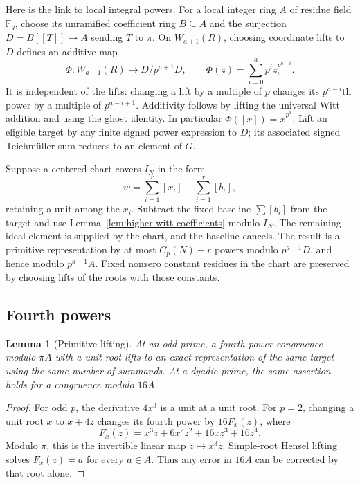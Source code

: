 \documentclass[11pt]{amsart}
\newtheorem{lemma}[theorem]{Lemma}
\theoremstyle{definition}
\numberwithin{equation}{section}
\begin{document}
Here is the link to local integral powers. For a local integer ring
$A$ of residue field $\mathbb F_q$, choose its unramified coefficient
ring $B\subseteq A$ and the surjection $D=B[[T]]\to A$ sending
$T$ to $\pi$. On $W_{a+1}(R)$, choosing coordinate lifts to $D$
defines an additive map
\begin{equation}\label{eq:higher-last-ghost}
 \Phi:W_{a+1}(R)\longrightarrow D/p^{a+1}D,
 \qquad \Phi(z)=\sum_{i=0}^a p^i\widetilde z_i^{p^{a-i}}.
\end{equation}
It is independent of the lifts: changing a lift by a multiple of
$p$ changes its $p^{a-i}$th power by a multiple of $p^{a-i+1}$.
Additivity follows by lifting the universal Witt addition and using
the ghost identity. In particular $\Phi([x])=\widetilde x^{p^a}$.
Lift an eligible target by any finite signed power expression to
$D$; its associated signed Teichm\"uller sum reduces to an element
of $G$.

Suppose a centered chart covers $I_N$ in the form
\[
 w=\sum_{i=1}^r[x_i]-\sum_{i=1}^r[b_i],
\]
retaining a unit among the $x_i$. Subtract the fixed baseline
$\sum[b_i]$ from the target and use Lemma~\ref{lem:higher-witt-coefficients}
modulo $I_N$. The remaining ideal element is supplied by the chart,
and the baseline cancels. The result is a primitive representation
by at most $C_p(N)+r$ powers modulo $p^{a+1}D$, and hence modulo
$p^{a+1}A$. Fixed nonzero constant residues in the chart are
preserved by choosing lifts of the roots with those constants.

\subsection{Fourth powers}
\begin{lemma}[Primitive lifting]\label{lem:primitive-lifting}
At an odd prime, a fourth-power congruence modulo $\pi A$ with
a unit root lifts to an exact representation of the same target
using the same number of summands. At a dyadic prime, the same
assertion holds for a congruence modulo $16A$.
\end{lemma}
\begin{proof}
For odd $p$, the derivative $4x^3$ is a unit at a unit root.
For $p=2$, changing a unit root $x$ to $x+4z$ changes its fourth
power by $16F_x(z)$, where
\[
 F_x(z)=x^3z+6x^2z^2+16xz^3+16z^4.
\]
Modulo $\pi$, this is the invertible linear map $z\mapsto\bar x^3z$.
Simple-root Hensel lifting solves $F_x(z)=a$ for every $a\in A$.
Thus any error in $16A$ can be corrected by that root alone.
\end{proof}
\end{document}
